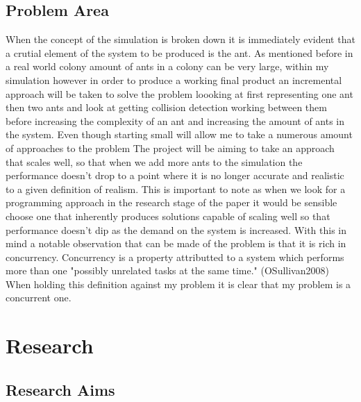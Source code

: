 \documentclass{report}
\begin{document}
\section{Problem Area}
When the concept of the simulation is broken down it is immediately evident that a crutial element of the system to be produced is the ant. As mentioned before in a real world colony amount of ants in a colony can be very large, within my simulation however in order to produce a working final product an incremental approach will be taken to solve the problem loooking at first representing one ant then two ants and look at getting collision detection working between them before increasing the complexity of an ant and increasing the amount of ants in the system. Even though starting small will allow me to take a numerous amount of approaches to the problem The project will be aiming to take an approach that scales well, so that when we add more ants to the simulation the performance doesn't drop to a point where it is no longer accurate and realistic to a given definition of realism. This is important to note as when we look for a programming approach in the research stage of the paper it would be sensible choose one that inherently produces solutions capable of scaling well so that performance doesn't dip as the demand on the system is increased. With this in mind a notable observation that can be made of the problem is that it is rich in concurrency. Concurrency is a property attributted to a system which performs more than one "possibly unrelated tasks at the same time." (OSullivan2008) When holding this definition against my problem it is clear that my problem is a concurrent one.

\chapter{Research}
\section {Research Aims}
\end{document}
